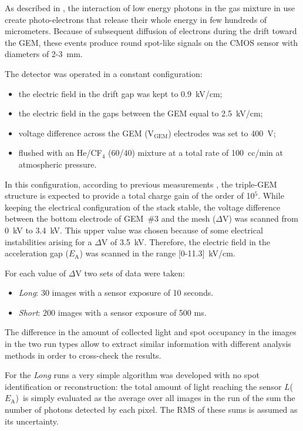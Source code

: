 \documentclass[a4paper,11pt]{article}
\newcommand{\Ea}  {$E_{\mathrm{A}}$}
\newcommand{\La}  {$L$(\Ea)}
\newcommand{\Vg}  {V$_{\mathrm{GEM}}$}
\begin{document}
As described in \cite{bib:fe55}, the interaction of low energy photons in the gas mixture in use create photo-electrons that release their whole energy in few hundreds of micrometers. Because of subsequent diffusion of electrons during the drift toward the GEM, these events produce round spot-like signals on the CMOS sensor with diameters of 2-3~mm.

The detector was operated in a constant configuration: 
\begin{itemize}
    \item the electric field in the drift gap was kept to 0.9~kV/cm;
    \item the electric field in the gaps between the GEM equal to 2.5~kV/cm;
    \item voltage difference across the GEM (\Vg) electrodes was set to 400~V;
    \item flushed with an He/CF$_4$ (60/40) mixture at a total rate of 100~cc/min at atmospheric pressure.
\end{itemize}

In this configuration, according to previous measurements \cite{bib:ieee_orange}, the triple-GEM structure is expected to provide a total charge gain of the order of 10$^5$.
While keeping the electrical configuration of the stack stable, the voltage difference between the bottom electrode of GEM~\#3 and the mesh ($\Delta$V) was scanned from 0~kV to 3.4~kV. This upper value was chosen because of some electrical instabilities arising for a $\Delta$V of 3.5~kV.
Therefore, the electric field in the acceleration gap (\Ea) was scanned in the range [0-11.3]~kV/cm. 

For each value of $\Delta$V two sets of data were taken:

\begin{itemize}
    \item {\it Long}: 30 images with a sensor exposure of 10 seconds. 
    \item {\it Short}: 200 images with a sensor exposure of 500 ms. 
\end{itemize}

The difference in the amount of collected light and spot occupancy in the images in the two run types allow to extract similar information with different analysis methods in order to cross-check the results.

For the {\it Long} runs a very simple algorithm was developed with no spot identification or reconstruction: the total amount of light reaching the sensor \La\ is simply evaluated as the average over all images in the run of the sum the number of photons detected by each pixel. The RMS of these sums is assumed as its uncertainty.
\end{document}
